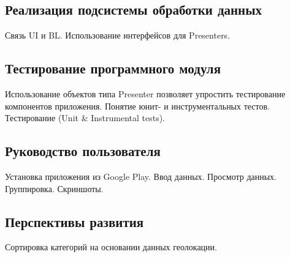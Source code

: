 


\subsection{Реализация подсистемы обработки данных}
\label{subsec:implementation_bl}

Связь UI и BL. Использование интерфейсов для Presenters.



\subsection{Тестирование программного модуля}

Использование объектов типа Presenter позволяет упростить
тестирование компонентов приложения.
Понятие юнит- и инструментальных тестов.
Тестирование (Unit \& Instrumental tests).

\subsection{Руководство пользователя}

Установка приложения из Google Play.
Ввод данных. Просмотр данных. Группировка.
Скриншоты.

\subsection{Перспективы развития}

Сортировка категорий на основании данных геолокации.
